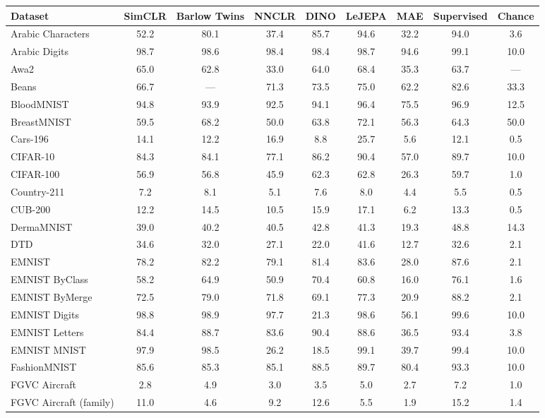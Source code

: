 \begin{tabular}{l c c c c c c c c }
\toprule
\textbf{Dataset} & SimCLR & Barlow Twins & NNCLR & DINO & LeJEPA & MAE & Supervised & \textbf{Chance} \\
\midrule
Arabic Characters & 52.2 & 80.1 & 37.4 & 85.7 & 94.6 & 32.2 & 94.0 & 3.6 \\
Arabic Digits & 98.7 & 98.6 & 98.4 & 98.4 & 98.7 & 94.6 & 99.1 & 10.0 \\
Awa2 & 65.0 & 62.8 & 33.0 & 64.0 & 68.4 & 35.3 & 63.7 & --- \\
Beans & 66.7 & --- & 71.3 & 73.5 & 75.0 & 62.2 & 82.6 & 33.3 \\
BloodMNIST & 94.8 & 93.9 & 92.5 & 94.1 & 96.4 & 75.5 & 96.9 & 12.5 \\
BreastMNIST & 59.5 & 68.2 & 50.0 & 63.8 & 72.1 & 56.3 & 64.3 & 50.0 \\
Cars-196 & 14.1 & 12.2 & 16.9 & 8.8 & 25.7 & 5.6 & 12.1 & 0.5 \\
CIFAR-10 & 84.3 & 84.1 & 77.1 & 86.2 & 90.4 & 57.0 & 89.7 & 10.0 \\
CIFAR-100 & 56.9 & 56.8 & 45.9 & 62.3 & 62.8 & 26.3 & 59.7 & 1.0 \\
Country-211 & 7.2 & 8.1 & 5.1 & 7.6 & 8.0 & 4.4 & 5.5 & 0.5 \\
CUB-200 & 12.2 & 14.5 & 10.5 & 15.9 & 17.1 & 6.2 & 13.3 & 0.5 \\
DermaMNIST & 39.0 & 40.2 & 40.5 & 42.8 & 41.3 & 19.3 & 48.8 & 14.3 \\
DTD & 34.6 & 32.0 & 27.1 & 22.0 & 41.6 & 12.7 & 32.6 & 2.1 \\
EMNIST & 78.2 & 82.2 & 79.1 & 81.4 & 83.6 & 28.0 & 87.6 & 2.1 \\
EMNIST ByClass & 58.2 & 64.9 & 50.9 & 70.4 & 60.8 & 16.0 & 76.1 & 1.6 \\
EMNIST ByMerge & 72.5 & 79.0 & 71.8 & 69.1 & 77.3 & 20.9 & 88.2 & 2.1 \\
EMNIST Digits & 98.8 & 98.9 & 97.7 & 21.3 & 98.6 & 56.1 & 99.6 & 10.0 \\
EMNIST Letters & 84.4 & 88.7 & 83.6 & 90.4 & 88.6 & 36.5 & 93.4 & 3.8 \\
EMNIST MNIST & 97.9 & 98.5 & 26.2 & 18.5 & 99.1 & 39.7 & 99.4 & 10.0 \\
FashionMNIST & 85.6 & 85.3 & 85.1 & 88.5 & 89.7 & 80.4 & 93.3 & 10.0 \\
FGVC Aircraft & 2.8 & 4.9 & 3.0 & 3.5 & 5.0 & 2.7 & 7.2 & 1.0 \\
FGVC Aircraft (family) & 11.0 & 4.6 & 9.2 & 12.6 & 5.5 & 1.9 & 15.2 & 1.4 \\

\end{tabular}
